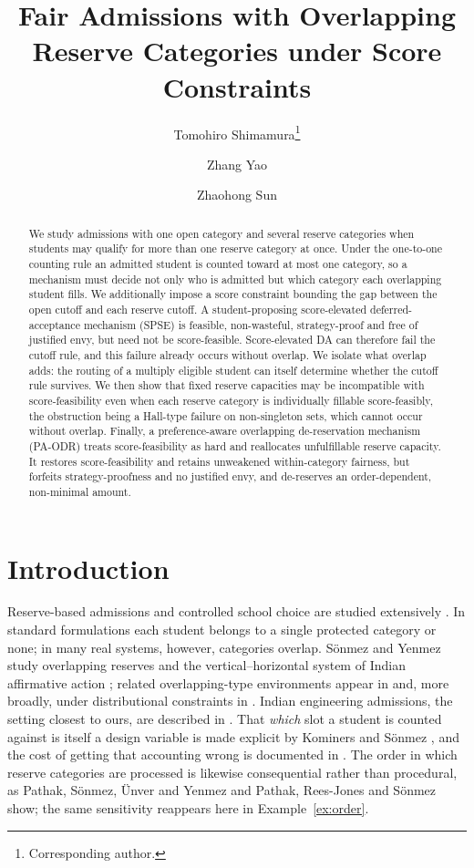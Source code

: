 \documentclass[runningheads]{llncs}
\title{Fair Admissions with Overlapping Reserve Categories under Score Constraints}
\author{Tomohiro Shimamura\inst{1}\thanks{Corresponding author.}\and
Zhang Yao\inst{1}\and
Zhaohong Sun\inst{1}}
\institute{Kyushu University, Fukuoka, Japan\\
\email{shimamura.tomohiro.741@s.kyushu-u.ac.jp}\\
\email{zhang@agent.inf.kyushu-u.ac.jp}\\
\email{sun@agent.inf.kyushu-u.ac.jp}}
\begin{document}
\maketitle

\begin{abstract}
We study admissions with one open category and several reserve categories when students may qualify for more than one reserve category at once. Under the one-to-one counting rule an admitted student is counted toward at most one category, so a mechanism must decide not only who is admitted but which category each overlapping student fills. We additionally impose a score constraint bounding the gap between the open cutoff and each reserve cutoff. A student-proposing score-elevated deferred-acceptance mechanism (SPSE) is feasible, non-wasteful, strategy-proof and free of justified envy, but need not be score-feasible. Score-elevated DA can therefore fail the cutoff rule, and this failure already occurs without overlap. We isolate what overlap adds: the routing of a multiply eligible student can itself determine whether the cutoff rule survives. We then show that fixed reserve capacities may be incompatible with score-feasibility even when each reserve category is individually fillable score-feasibly, the obstruction being a Hall-type failure on non-singleton sets, which cannot occur without overlap. Finally, a preference-aware overlapping de-reservation mechanism (PA-ODR) treats score-feasibility as hard and reallocates unfulfillable reserve capacity. It restores score-feasibility and retains unweakened within-category fairness, but forfeits strategy-proofness and no justified envy, and de-reserves an order-dependent, non-minimal amount.

\end{abstract}

\section{Introduction}
Reserve-based admissions and controlled school choice are studied extensively \cite{Abdu05a,EHYY14a,HYY13a,EcYe15a,AyTu20a,AyTu23a}. In standard formulations each student belongs to a single protected category or none; in many real systems, however, categories overlap. S\"onmez and Yenmez study overlapping reserves \cite{SoYe20a} and the vertical--horizontal system of Indian affirmative action \cite{SoYe22a}; related overlapping-type environments appear in \cite{KHIY17a,AyBo21a,DKT23a} and, more broadly, under distributional constraints in \cite{GKK+17a,KaKo24a}. Indian engineering admissions, the setting closest to ours, are described in \cite{BCC+19b}. That \emph{which} slot a student is counted against is itself a design variable is made explicit by Kominers and S\"onmez \cite{KoSo16a}, and the cost of getting that accounting wrong is documented in \cite{DKPS18a}. The order in which reserve categories are processed is likewise consequential rather than procedural, as Pathak, S\"onmez, \"Unver and Yenmez \cite{PSUY24a} and Pathak, Rees-Jones and S\"onmez \cite{PRS23a} show; the same sensitivity reappears here in Example~\ref{ex:order}.
\end{document}

